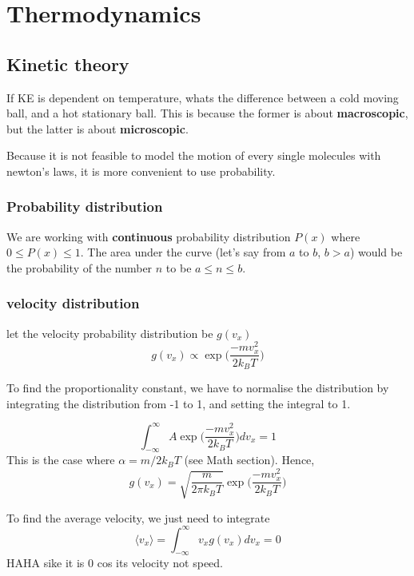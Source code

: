 \chapter{Thermodynamics}
\section{Kinetic theory}
If KE is dependent on temperature, whats the difference between a cold moving ball, and a hot stationary ball. This is because the former is about \textbf{macroscopic}, but the latter is about \textbf{microscopic}. 

Because it is not feasible to model the motion of every single molecules with newton's laws, it is more convenient to use probability.

\subsection{Probability distribution}
We are working with \textbf{continuous} probability distribution $P(x) $ where $0 \leq P(x) \leq 1$. The area under the curve (let's say from $a$ to $b$, $b>a$) would be the probability of the number $n$ to be $a\leq n\leq b$.

\subsection{velocity distribution}
let the velocity probability distribution be $g(v_x)$
\begin{equation}
    g(v_x)\propto \exp\bigg({\frac{-mv_x^2}{2k_B T}}\bigg)
\end{equation}

To find the proportionality constant, we have to normalise the distribution by integrating the distribution from -1 to 1, and setting the integral to 1.

\begin{equation}
    \int_{-\infty}^{\infty}A\exp\bigg({\frac{-mv_x^2}{2k_B T}}\bigg)dv_x = 1
\end{equation}
This is the case where $\alpha=m/2k_BT$ (see Math section). Hence,
\begin{equation}
    g(v_x)=\sqrt{\frac{m}{2\pi k_B T}}\exp\bigg({\frac{-mv_x^2}{2k_BT}}\bigg)
\end{equation} 

To find the average velocity, we just need to integrate 
\begin{equation}
    \langle v_x \rangle =\int_{-\infty}^{\infty}v_xg(v_x)dv_x=0
\end{equation}
HAHA sike it is 0 cos its velocity not speed.

